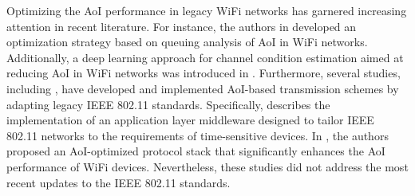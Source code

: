 Optimizing the AoI performance in legacy WiFi networks has garnered increasing attention in recent literature. For instance, the authors in \cite{10000608} developed an optimization strategy based on queuing analysis of AoI in WiFi networks. Additionally, a deep learning approach for channel condition estimation aimed at reducing AoI in WiFi networks was introduced in \cite{9973486}. Furthermore, several studies, including \cite{9522228, 10228860, 10349886}, have developed and implemented AoI-based transmission schemes by adapting legacy IEEE 802.11 standards. Specifically, \cite{10228860} describes the implementation of an application layer middleware designed to tailor IEEE 802.11 networks to the requirements of time-sensitive devices. In \cite{10349886}, the authors proposed an AoI-optimized protocol stack that significantly enhances the AoI performance of WiFi devices. Nevertheless, these studies did not address the most recent updates to the IEEE 802.11 standards.